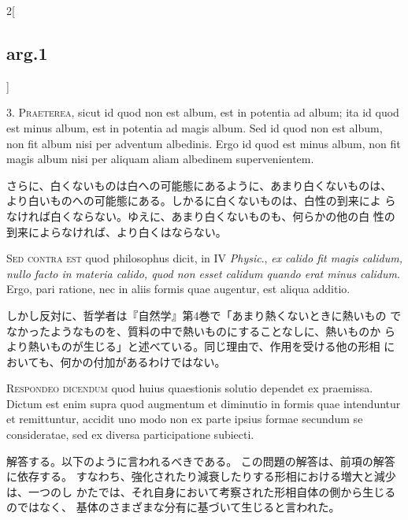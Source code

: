 \documentclass[paper=a4paper,fontsize=10pt,jafontsize=9pt,titlepage]{jlreq}
\begin{document}
\begin{paracol}{2}[\subsection{arg.1}]

3. {\scshape Praeterea}, sicut id quod non est album, est in potentia ad album; ita
id quod est minus album, est in potentia ad magis album. Sed id quod
non est album, non fit album nisi per adventum albedinis. Ergo id quod
est minus album, non fit magis album nisi per aliquam aliam albedinem
supervenientem.

\switchcolumn

さらに、白くないものは白への可能態にあるように、あまり白くないものは、
 より白いものへの可能態にある。しかるに白くないものは、白性の到来によ
 らなければ白くならない。ゆえに、あまり白くないものも、何らかの他の白
 性の到来によらなければ、より白くはならない。

\switchcolumn*[\subsection{s.c.}]

{\scshape Sed contra est} quod philosophus dicit, in IV {\itshape
Physic}., {\itshape ex calido fit magis calidum, nullo facto in
materia calido, quod non esset calidum quando erat minus
calidum}. Ergo, pari ratione, nec in aliis formis quae augentur, est
aliqua additio.

\switchcolumn

しかし反対に、哲学者は『自然学』第4巻で「あまり熱くないときに熱いもの
でなかったようなものを、質料の中で熱いものにすることなしに、熱いものか
らより熱いものが生じる」と述べている。同じ理由で、作用を受ける他の形相
においても、何かの付加があるわけではない。


{\scshape Respondeo dicendum} quod huius quaestionis solutio dependet ex
praemissa. Dictum est enim supra quod augmentum et diminutio in formis
quae intenduntur et remittuntur, accidit uno modo non ex parte ipsius
formae secundum se consideratae, sed ex diversa participatione
subiecti.

\switchcolumn

解答する。以下のように言われるべきである。
この問題の解答は、前項の解答に依存する。
すなわち、強化されたり減衰したりする形相における増大と減少は、一つのし
 かたでは、それ自身において考察された形相自体の側から生じるのではなく、
 基体のさまざまな分有に基づいて生じると言われた。


\end{paracol}
\end{document}

